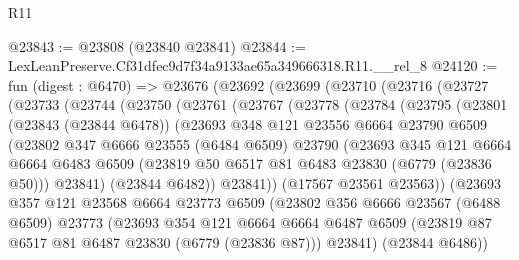 \begin{lexlean}{R11}
\begin{coremodule}
@23843 := @23808 (@23840 @23841)
@23844 := LexLeanPreserve.Cf31dfec9d7f34a9133ae65a349666318.R11.__rel_8
@24120 := fun (digest : @6470) =>
  @23676
    (@23692
      (@23699
        (@23710
          (@23716
            (@23727
              (@23733
                (@23744
                  (@23750
                    (@23761
                      (@23767
                        (@23778
                          (@23784
                            (@23795
                              (@23801
                                (@23843 (@23844 @6478))
                                (@23693
                                  @348
                                  @121
                                  @23556
                                  @6664
                                  @23790
                                  @6509
                                  (@23802
                                    @347
                                    @6666
                                    @23555
                                    (@6484 @6509)
                                    @23790
                                    (@23693
                                      @345
                                      @121
                                      @6664
                                      @6664
                                      @6483
                                      @6509
                                      (@23819 @50 @6517 @81 @6483 @23830 (@6779 (@23836 @50)))
                                      @23841)
                                    (@23844 @6482))
                                  @23841))
                              (@17567 @23561 @23563))
                            (@23693
                              @357
                              @121
                              @23568
                              @6664
                              @23773
                              @6509
                              (@23802
                                @356
                                @6666
                                @23567
                                (@6488 @6509)
                                @23773
                                (@23693
                                  @354
                                  @121
                                  @6664
                                  @6664
                                  @6487
                                  @6509
                                  (@23819 @87 @6517 @81 @6487 @23830 (@6779 (@23836 @87)))
                                  @23841)
                                (@23844 @6486))

\end{coremodule}
\end{lexlean}
